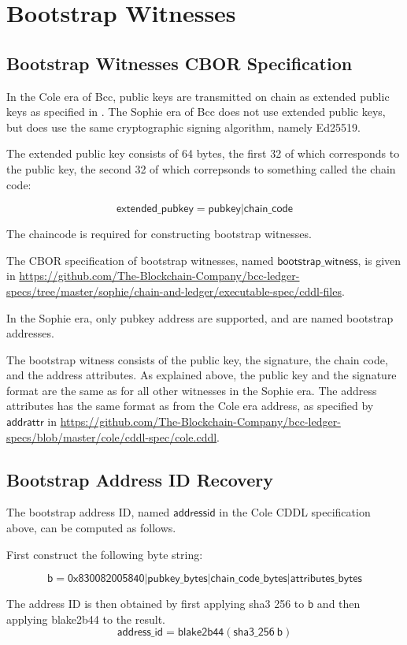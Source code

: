 \section{Bootstrap Witnesses}
\label{sec:bootstrap-witnesses}

\subsection{Bootstrap Witnesses CBOR Specification}

In the Cole era of Bcc, public keys are transmitted
on chain as extended public keys as specified in \cite{bip32}.
The Sophie era of Bcc does not use extended public keys,
but does use the same cryptographic signing algorithm,
namely Ed25519.

The extended public key consists of 64 bytes,
the first 32 of which corresponds to the public key,
the second 32 of which correpsonds to something called the chain code:

$$\mathsf{extended\_pubkey} = \mathsf{pubkey}|\mathsf{chain\_code}$$

The chaincode is required for constructing bootstrap witnesses.

The CBOR specification of bootstrap witnesses,
named $\mathsf{bootstrap\_witness}$,
is given in
\url{https://github.com/The-Blockchain-Company/bcc-ledger-specs/tree/master/sophie/chain-and-ledger/executable-spec/cddl-files}.

In the Sophie era, only pubkey address are supported,
and are named bootstrap addresses.

The bootstrap witness consists of the public key, the signature,
the chain code, and the address attributes.
As explained above, the public key and the signature format
are the same as for all other witnesses in the Sophie era.
The address attributes has the same format as from the Cole era address,
as specified by $\mathsf{addrattr}$ in
\url{https://github.com/The-Blockchain-Company/bcc-ledger-specs/blob/master/cole/cddl-spec/cole.cddl}.


\subsection{Bootstrap Address ID Recovery}

The bootstrap address ID, named $\mathsf{addressid}$ in the Cole CDDL
specification above, can be computed as follows.

First construct the following byte string:

$$\mathsf{b} =
  \mathsf{0x830082005840}
  | \mathsf{pubkey\_bytes}
  | \mathsf{chain\_code\_bytes}
  | \mathsf{attributes\_bytes}
$$

The address ID is then obtained by first applying
sha3 256 to $\mathsf{b}$ and then applying blake2b44 to the result.
$$\mathsf{address\_id} =
  \mathsf{blake2b44}(\mathsf{sha3\_256}~\mathsf{b})
$$
